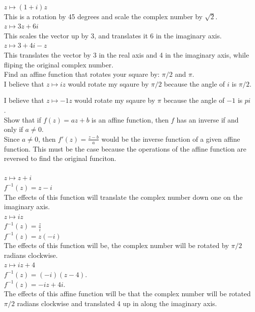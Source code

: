 \documentclass[12pt]{article}
\begin{document}
 $z \mapsto (1 + i)z$\\
This is a rotation by 45 degrees and scale the complex number by $\sqrt{2}$.\\


 $z \mapsto 3z + 6i$\\
This scales the vector up by 3, and translates it 6 in the imaginary axis.\\


 $z \mapsto 3 + 4i - z$\\
This translates the vector by 3 in the real axis and 4 in the imaginary axis, while fliping the original complex number.\\


 Find an affine function that rotates your square by: $\pi/2$ and $\pi$.\\
I believe that $z \mapsto iz$ would rotate my sqaure by $\pi/2$ because the angle of $i$ is $\pi/2$.

I believe that $z \mapsto -1z$ would rotate my sqaure by $\pi$ because the angle of $-1$ is $pi$.\\


 Show that if $f(z) = az + b$ is an affine function, then $f$ has an inverse if and only if $a \neq 0$.\\ 

Since $a \neq 0$, then $f'(z) = \frac{z-b}{a}$ would be the inverse function of a given affine function. 
This must be the case because the operations of the affine function are reversed to find the original funciton.\\

\\

 $z \mapsto z + i$\\
$f^{-1}(z) = z - i$\\
The effects of this function will translate the complex number down one on the imaginary axis.\\


 $z \mapsto iz$\\
$f^{-1}(z) = \frac{z}{i}$\\
$f^{-1}(z) = z(-i)$\\
The effects of this function will be, the complex number will be rotated by $\pi/2$ radians clockwise.\\


 $z \mapsto iz + 4$\\
$f^{-1}(z) = (-i)(z - 4)$.\\
$f^{-1}(z) = -iz + 4i$.\\
The effects of this affine function will be that the complex number will be rotated $\pi/2$ radians clockwise and translated 4 up in along the imaginary axis.\\
\end{document}
